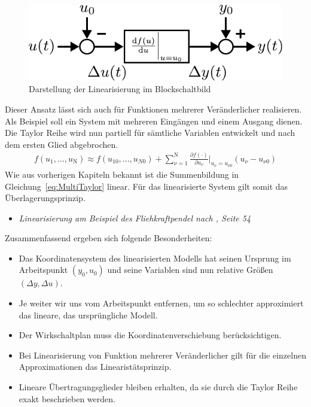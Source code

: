 %
\begin{figure}[h!]
	\centering
	\includegraphics[width=0.5\linewidth]{Abbildungen/Modellbildung/PDF/LinearisierungBlock.pdf}
	\caption{Darstellung der Linearisierung im Blockschaltbild}
	\label{fig:LinBlock}
\end{figure}
%
Dieser Ansatz lässt sich auch für Funktionen mehrerer Veränderlicher realisieren. Als Beispiel soll ein System mit mehreren Eingängen und einem Ausgang dienen. Die Taylor Reihe wird nun partiell für sämtliche Variablen entwickelt und nach dem ersten Glied abgebrochen. 
%
\begin{equation*}
\begin{aligned}
%
f(u_{1},..., u_{\text{N}})\approx f(u_{10},..., u_{N0})+\sum_{\nu=1}^{\text{N}}\frac{\partial f(\cdot)}{\partial u_{\nu}}\bigg\rvert_{u_{\nu}=u_{\nu 0}}\left(u_{\nu}-u_{\nu0}\right)\label{eq:MultiTaylor}
%
\end{aligned}
\end{equation*} 
%
Wie aus vorherigen Kapiteln bekannt ist die Summenbildung in Gleichung~\ref{eq:MultiTaylor} linear. Für das linearisierte System gilt somit das Überlagerungsprinzip.  
%
\begin{simulation}{}{}
	\begin{itemize}
		\item \textit{Linearisierung am Beispiel des Fliehkraftpendel nach \cite{MSF05}, Seite 54}
	\end{itemize}
\end{simulation}
%
Zusammenfassend ergeben sich folgende Besonderheiten:
%
\begin{itemize}
	\item Das Koordinatensystem des linearisierten Modells hat seinen Ursprung im Arbeitspunkt $(y_{0},u_{0})$ und seine Variablen sind nun relative Größen $(\Delta y,\Delta u)$.
	\item Je weiter wir uns vom Arbeitspunkt entfernen, um so schlechter approximiert das lineare, das ursprüngliche Modell.
	\item Der Wirkschaltplan muss die Koordinatenverschiebung berücksichtigen.
	\item Bei Linearisierung von Funktion mehrerer Veränderlicher gilt für die einzelnen Approximationen das Linearistätsprinzip.
	\item Lineare Übertragungsglieder bleiben erhalten, da sie durch die Taylor Reihe exakt beschrieben werden.
\end{itemize}
%
